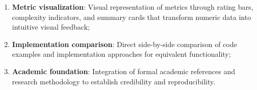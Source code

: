 {\begin{enumerate}
    \item \textbf{Metric visualization}: Visual representation of metrics through rating bars, complexity indicators, and summary cards that transform numeric data into intuitive visual feedback;
    
    \item \textbf{Implementation comparison}: Direct side-by-side comparison of code examples and implementation approaches for equivalent functionality;
    
    \item \textbf{Academic foundation}: Integration of formal academic references and research methodology to establish credibility and reproducibility.
\end{enumerate}

\begin{figure}[ht]
    \centering
    \begin{subfigure}[b]{0.48\textwidth}
        \centering

\end{subfigure}
\end{figure}}
